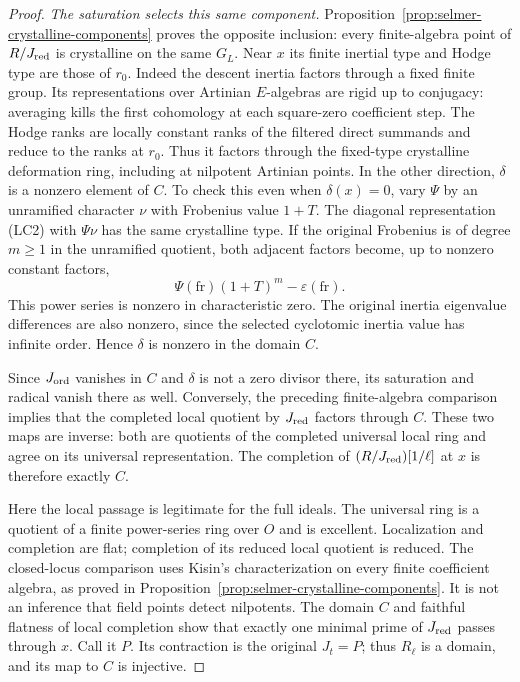 \begin{proof}
\emph{The saturation selects this same component.}
Proposition~\ref{prop:selmer-crystalline-components} proves the
opposite inclusion: every finite-algebra point of $R/J_{\rm red}$
is crystalline on the same $G_L$.  Near $x$ its finite inertial
type and Hodge type are those of $r_0$.  Indeed the descent inertia
factors through a fixed finite group.  Its representations over
Artinian $E$-algebras are rigid up to conjugacy: averaging kills
the first cohomology at each square-zero coefficient step.  The
Hodge ranks are locally constant ranks of the filtered direct
summands and reduce to the ranks at $r_0$.  Thus it factors through the
fixed-type crystalline deformation ring, including at nilpotent
Artinian points.  In the other direction, $\delta$ is a nonzero
element of $C$.  To check this even when $\delta(x)=0$, vary
$\Psi$ by an unramified character $\nu$ with Frobenius value
$1+T$.  The diagonal representation (LC2) with $\Psi\nu$ has the
same crystalline type.  If the original Frobenius is of degree
$m\ge1$ in the unramified quotient, both adjacent factors become,
up to nonzero constant factors,
\[
                  \Psi(\mathrm{fr})(1+T)^m
                           -\varepsilon(\mathrm{fr}).         \tag{LC7}
\]
This power series is nonzero in characteristic zero.  The original
inertia eigenvalue differences are also nonzero, since the selected
cyclotomic inertia value has infinite order.  Hence $\delta$ is
nonzero in the domain $C$.

Since $J_{\rm ord}$ vanishes in $C$ and $\delta$ is not a zero
divisor there, its saturation and radical vanish there as well.
Conversely, the preceding finite-algebra comparison implies that the
completed local quotient by $J_{\rm red}$ factors through $C$.
These two maps are inverse: both are quotients of the completed
universal local ring and agree on its universal representation.
The completion of $(R/J_{\rm red})[1/\ell]$ at $x$ is therefore
exactly $C$.

Here the local passage is legitimate for the full ideals.  The
universal ring is a quotient of a finite power-series ring over $O$
and is excellent.  Localization and completion are flat; completion
of its reduced local quotient is reduced.  The closed-locus comparison
uses Kisin's characterization on every finite coefficient algebra,
as proved in Proposition~\ref{prop:selmer-crystalline-components}.
It is not an inference that field points detect nilpotents.  The
domain $C$ and faithful flatness of local completion show that
exactly one minimal prime of $J_{\rm red}$ passes through $x$.
Call it $P$.  Its contraction is the original $J_t=P$; thus
$R_\ell$ is a domain, and its map to $C$ is injective.


\end{proof}

